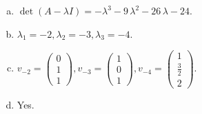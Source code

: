 \begin{questions}
\begin{solution}
\begin{enumerate}[(a)]
\item $\det(A-\lambda I)=-{\lambda}^{3} - 9 \, {\lambda}^{2} - 26 \, {\lambda} - 24$.
\item ${\lambda}_1=-2, {\lambda}_2=-3, {\lambda}_3=-4$.
\item $v_{-2}=\left(\begin{array}{r}
0 \\
1 \\
1
\end{array}\right), v_{-3}=\left(\begin{array}{r}
1 \\
0 \\
1
\end{array}\right), v_{-4}=\left(\begin{array}{r}
1 \\
\frac{3}{2} \\
2
\end{array}\right)$.
\item Yes.
\end{enumerate}
\end{solution}

\end{questions}

\newpage


\begin{center}
\end{center}


